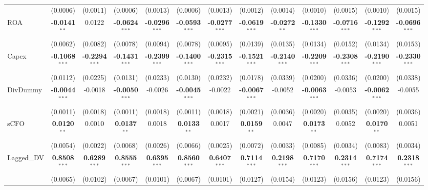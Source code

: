 \documentclass[11pt,a4paper]{article}
\begin{document}
\begin{table}[htbp]
\begin{tabular}{lcccccccccccc}
 & (0.0006) & (0.0011) & (0.0006) & (0.0013) & (0.0006) & (0.0013) & (0.0012) & (0.0014) & (0.0010) & (0.0015) & (0.0010) & (0.0015) \\
ROA & \textbf{-0.0141}$^{**}$ & 0.0122 & \textbf{-0.0624}$^{***}$ & \textbf{-0.0296}$^{***}$ & \textbf{-0.0593}$^{***}$ & \textbf{-0.0277}$^{***}$ & \textbf{-0.0619}$^{***}$ & \textbf{-0.0272}$^{**}$ & \textbf{-0.1330}$^{***}$ & \textbf{-0.0716}$^{***}$ & \textbf{-0.1292}$^{***}$ & \textbf{-0.0696}$^{***}$ \\
 & (0.0062) & (0.0082) & (0.0078) & (0.0094) & (0.0078) & (0.0095) & (0.0139) & (0.0135) & (0.0134) & (0.0152) & (0.0134) & (0.0153) \\
Capex & \textbf{-0.1068}$^{***}$ & \textbf{-0.2294}$^{***}$ & \textbf{-0.1431}$^{***}$ & \textbf{-0.2399}$^{***}$ & \textbf{-0.1400}$^{***}$ & \textbf{-0.2315}$^{***}$ & \textbf{-0.1521}$^{***}$ & \textbf{-0.2140}$^{***}$ & \textbf{-0.2209}$^{***}$ & \textbf{-0.2308}$^{***}$ & \textbf{-0.2190}$^{***}$ & \textbf{-0.2330}$^{***}$ \\
 & (0.0112) & (0.0225) & (0.0131) & (0.0233) & (0.0130) & (0.0232) & (0.0178) & (0.0339) & (0.0200) & (0.0336) & (0.0200) & (0.0338) \\
DivDummy & \textbf{-0.0044}$^{***}$ & -0.0018 & \textbf{-0.0050}$^{***}$ & -0.0026 & \textbf{-0.0045}$^{***}$ & -0.0022 & \textbf{-0.0067}$^{***}$ & -0.0052 & \textbf{-0.0063}$^{***}$ & -0.0053 & \textbf{-0.0062}$^{***}$ & -0.0055 \\
 & (0.0011) & (0.0018) & (0.0011) & (0.0018) & (0.0011) & (0.0018) & (0.0021) & (0.0036) & (0.0020) & (0.0035) & (0.0020) & (0.0036) \\
sCFO & \textbf{0.0120}$^{**}$ & 0.0010 & \textbf{0.0137}$^{**}$ & 0.0018 & \textbf{0.0133}$^{**}$ & 0.0017 & \textbf{0.0159}$^{**}$ & 0.0047 & \textbf{0.0173}$^{**}$ & 0.0052 & \textbf{0.0170}$^{**}$ & 0.0051 \\
 & (0.0054) & (0.0022) & (0.0068) & (0.0026) & (0.0066) & (0.0025) & (0.0072) & (0.0033) & (0.0085) & (0.0034) & (0.0083) & (0.0034) \\
Lagged\_DV & \textbf{0.8508}$^{***}$ & \textbf{0.6289}$^{***}$ & \textbf{0.8555}$^{***}$ & \textbf{0.6395}$^{***}$ & \textbf{0.8560}$^{***}$ & \textbf{0.6407}$^{***}$ & \textbf{0.7114}$^{***}$ & \textbf{0.2198}$^{***}$ & \textbf{0.7170}$^{***}$ & \textbf{0.2314}$^{***}$ & \textbf{0.7174}$^{***}$ & \textbf{0.2318}$^{***}$ \\
 & (0.0065) & (0.0102) & (0.0067) & (0.0101) & (0.0067) & (0.0101) & (0.0127) & (0.0154) & (0.0123) & (0.0156) & (0.0123) & (0.0156) \\

\end{tabular}
\end{table}
\end{document}
